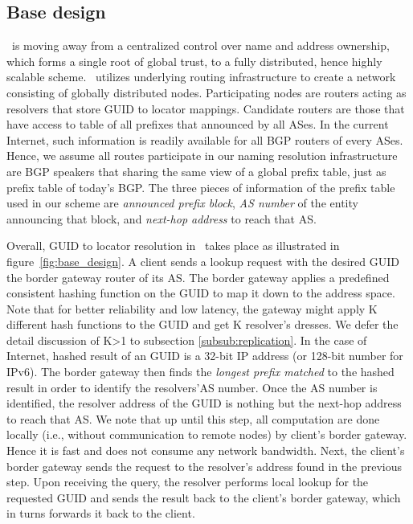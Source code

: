    \subsection{Base design}
        \arcName~is moving away from a centralized control over name and address ownership, which forms a single root of global trust, to a fully distributed, hence highly scalable scheme. \arcName~utilizes underlying routing infrastructure to create a network consisting of globally distributed nodes. Participating nodes are routers acting as resolvers that store GUID to locator mappings. Candidate routers are those that have access to table of all prefixes that announced by all ASes. In the current Internet, such information is readily available for all BGP routers of every ASes. Hence, we assume all routes participate in our naming resolution infrastructure are BGP speakers that sharing the same view of a global prefix table, just as prefix table of today's BGP.  The three pieces of information of the prefix table used in our scheme are \emph{announced prefix block}, \emph{AS number} of the entity announcing that block, and \emph{next-hop address} to reach that AS.        
        
        Overall, GUID to locator resolution in \arcName~takes place as illustrated in figure~\ref{fig:base_design}. A client sends a lookup request with the desired GUID the border gateway router of its AS. The border gateway applies a predefined consistent hashing function on the GUID to map it down to the address space. Note that for better reliability and low latency, the gateway might apply K different hash functions to the GUID and get K resolver's dresses. We defer the detail discussion of K>1 to subsection \ref{subsub:replication}. In the case of Internet, hashed result of an GUID is a 32-bit IP address (or 128-bit number for IPv6). The border gateway then finds the \emph{longest prefix matched} to the hashed result in order to identify the resolvers'AS number. Once the AS number is identified, the resolver address of the GUID is nothing but the next-hop address to reach that AS. We note that up until this step, all computation are done locally (i.e., without communication to remote nodes) by client's border gateway. Hence it is fast and does not consume any network bandwidth.
        Next, the client's border gateway sends the request to the resolver's address found in the previous step. Upon receiving the query, the resolver performs local lookup for the requested GUID and sends the result back to the client's border gateway, which in turns forwards it back to the client. %

